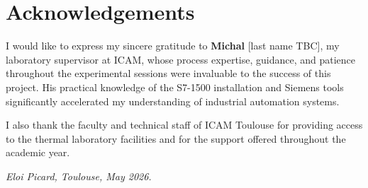 \clearpage
\chapter*{Acknowledgements}

I would like to express my sincere gratitude to \textbf{Michal} [last name TBC], my
laboratory supervisor at ICAM, whose process expertise, guidance, and patience throughout
the experimental sessions were invaluable to the success of this project. His practical
knowledge of the S7-1500 installation and Siemens tools significantly accelerated my
understanding of industrial automation systems.

I also thank the faculty and technical staff of ICAM Toulouse for providing access to the
thermal laboratory facilities and for the support offered throughout the academic year.

\vspace{1cm}
\noindent\textit{Eloi Picard, Toulouse, May 2026.}
